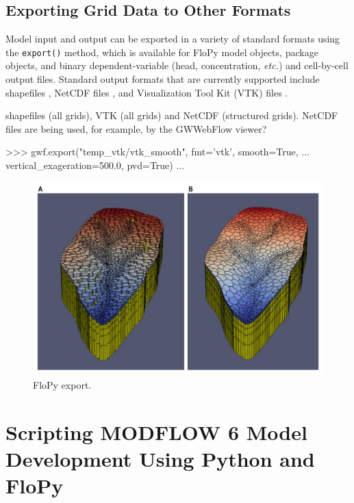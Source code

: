 \documentclass[11pt, oneside]{article}  	%
\begin{document}

\subsection{Exporting Grid Data to Other Formats}

Model input and output can be exported in a variety of standard formats using the \texttt{export()} method, which is available for FloPy model objects, package objects, and binary dependent-variable (head, concentration, \textit{etc.}) and cell-by-cell output files. Standard output formats that are currently supported include shapefiles \citep{environmental1998esri}, NetCDF files \citep{rew2006netcdf, rew1990netcdf}, and Visualization Tool Kit (VTK) files \citep{schroeder:2006:VTK}.

shapefiles (all grids), VTK (all grids) and NetCDF (structured grids). NetCDF files are being used, for example, by the GWWebFlow viewer? 

\begin{python}
>>> gwf.export("temp_vtk/vtk_smooth", fmt='vtk', smooth=True,
... vertical_exageration=500.0, pvd=True)
...
\end{python}


\begin{figure}[ht!]
	\begin{center}
		\includegraphics{figures/mf6vtk.pdf}
	\end{center}
	\caption{FloPy export.}
	\label{fig:flopyvtk}
\end{figure}


\section{Scripting MODFLOW 6 Model Development Using Python and FloPy}
\end{document}
